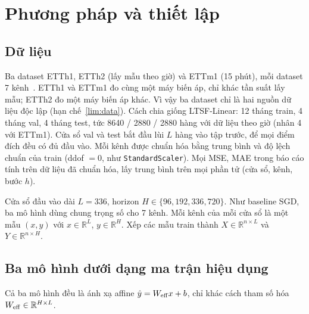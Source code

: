 \section{Phương pháp và thiết lập}
\label{sec:method}

\subsection{Dữ liệu}
\label{sec:method-data}

Ba dataset ETTh1, ETTh2 (lấy mẫu theo giờ) và ETTm1 (15 phút), mỗi dataset 7 kênh~\cite{zhou2021informer}. ETTh1 và ETTm1 đo cùng một máy biến áp, chỉ khác tần suất lấy mẫu; ETTh2 đo một máy biến áp khác. Vì vậy ba dataset chỉ là hai nguồn dữ liệu độc lập (hạn chế~\ref{lim:data}). Cách chia giống LTSF-Linear: 12 tháng train, 4 tháng val, 4 tháng test, tức 8640 / 2880 / 2880 hàng với dữ liệu theo giờ (nhân 4 với ETTm1). Cửa sổ val và test bắt đầu lùi $L$ hàng vào tập trước, để mọi điểm đích đều có đủ đầu vào. Mỗi kênh được chuẩn hóa bằng trung bình và độ lệch chuẩn của train (ddof $= 0$, như \texttt{StandardScaler}). Mọi MSE, MAE trong báo cáo tính trên dữ liệu đã chuẩn hóa, lấy trung bình trên mọi phần tử (cửa sổ, kênh, bước $h$).

Cửa sổ đầu vào dài $L = 336$, horizon $H \in \{96, 192, 336, 720\}$. Như baseline SGD, ba mô hình dùng chung trọng số cho 7 kênh. Mỗi kênh của mỗi cửa sổ là một mẫu $(x, y)$ với $x \in \mathbb{R}^L$, $y \in \mathbb{R}^H$. Xếp các mẫu train thành $X \in \mathbb{R}^{n \times L}$ và $Y \in \mathbb{R}^{n \times H}$.

\subsection{Ba mô hình dưới dạng ma trận hiệu dụng}
\label{sec:method-models}

Cả ba mô hình đều là ánh xạ affine $\hat y = W_{\mathrm{eff}} x + b$, chỉ khác cách tham số hóa $W_{\mathrm{eff}} \in \mathbb{R}^{H \times L}$.

